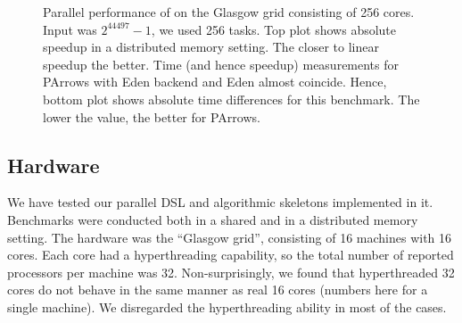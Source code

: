 










\begin{figure}
\centering
%
{\label{subfig:rm-dist-a}}%
{\label{subfig:rm-dist-b}}
\caption{Parallel performance of \rmtest on the Glasgow grid
  consisting of 256 cores. Input was $2^{44497}-1$, we used 256
  tasks. Top plot shows absolute speedup in a distributed memory setting. The
  closer to linear speedup the better. Time
  (and hence speedup) measurements for PArrows with Eden backend and
  Eden almost coincide. Hence, bottom plot shows
absolute time differences for this benchmark. The
lower the value, the better for PArrows.}
\label{fig:bench-rm-dist}
\end{figure}



\subsection{Hardware}

We have tested our parallel DSL and algorithmic skeletons implemented
in it. Benchmarks were conducted both in a shared and in a distributed
memory setting. The hardware was the ``Glasgow grid'', consisting of
16 machines with 16 cores. 
Each core had a hyperthreading capability,
so the total number of reported processors per machine was
32. Non-surprisingly, we found that hyperthreaded 32 cores do not
behave in the same manner as real 16 cores (numbers here for a single
machine). We disregarded the hyperthreading ability in most of the
cases.

